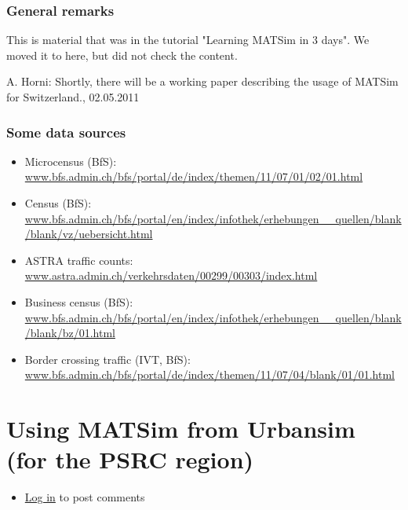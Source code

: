 \documentclass[a4paper,11pt]{report}
\begin{document}
\subsubsection{General remarks}

This is material that was in the tutorial "Learning MATSim in 3 days". We moved it to here, but did not check the content.

A. Horni: Shortly, there will be a working paper describing the usage of MATSim for Switzerland., 02.05.2011

\subsubsection{Some data sources}
\begin{itemize}
	\item Microcensus (BfS): \href{http://www.bfs.admin.ch/bfs/portal/de/index/themen/11/07/01/02/01.html}{www.bfs.admin.ch/bfs/portal/de/index/themen/11/07/01/02/01.html}
	\item Census (BfS): \href{http://www.bfs.admin.ch/bfs/portal/en/index/infothek/erhebungen__quellen/blank/blank/vz/uebersicht.html}{www.bfs.admin.ch/bfs/portal/en/index/infothek/erhebungen\_\_quellen/blank/blank/vz/uebersicht.html}
	\item ASTRA traffic counts: \href{http://www.astra.admin.ch/verkehrsdaten/00299/00303/index.html?lang=en}{www.astra.admin.ch/verkehrsdaten/00299/00303/index.html}
	\item Business census (BfS): \href{http://www.bfs.admin.ch/bfs/portal/en/index/infothek/erhebungen__quellen/blank/blank/bz/01.html}{www.bfs.admin.ch/bfs/portal/en/index/infothek/erhebungen\_\_quellen/blank/blank/bz/01.html}
	\item Border crossing traffic (IVT, BfS): \href{http://www.bfs.admin.ch/bfs/portal/de/index/themen/11/07/04/blank/01/01.html}{www.bfs.admin.ch/bfs/portal/de/index/themen/11/07/04/blank/01/01.html}
\end{itemize}


\vfill\eject
\section{Using MATSim from Urbansim (for the PSRC region)}
\begin{itemize}
	\item \href{http://www.matsim.org/user/login?destination=comment/reply/309%23comment-form}{Log in} to post comments
\end{itemize}
\end{document}
